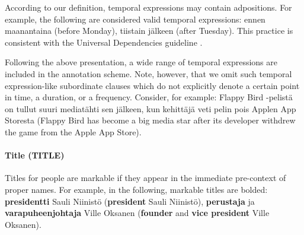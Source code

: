 \documentclass[11pt]{article}
\begin{document}
According to our definition, temporal expressions may contain adpositions. For example, the following are considered valid temporal expressions: ennen maanantaina (before Monday), tiistain j\"alkeen (after Tuesday). This practice is consistent with the Universal Dependencies guideline \cite{}. 

Following the above presentation, a wide range of temporal expressions are included in the annotation scheme. Note, however, that we omit such temporal expression-like subordinate clauses which do not explicitly denote a certain point in time, a duration, or a frequency. Consider, for example: Flappy  Bird -pelist\"a on tullut suuri mediat\"ahti sen j\"alkeen, kun kehitt\"aj\"a veti pelin pois Applen App Storesta (Flappy Bird has become a big media star after its developer withdrew the game from the Apple App Store).


\paragraph{Title (TITLE)}

Titles for people are markable if they appear in the immediate pre-context of proper names. For example, in the following, markable titles are bolded: \textbf{presidentti} Sauli Niinist\"o (\textbf{president} Sauli Niinist\"o), \textbf{perustaja} ja \textbf{varapuheenjohtaja} Ville Oksanen (\textbf{founder} and \textbf{vice president} Ville Oksanen).   







\end{document}
